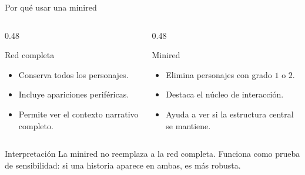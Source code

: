\documentclass[aspectratio=169,11pt]{beamer}
\begin{document}
\begin{frame}{Por qué usar una minired}
\begin{columns}[T,totalwidth=\textwidth]
\begin{column}{0.48\textwidth}
\begin{block}{Red completa}
\begin{itemize}
    \item Conserva todos los personajes.
    \item Incluye apariciones periféricas.
    \item Permite ver el contexto narrativo completo.
\end{itemize}
\end{block}
\end{column}

\begin{column}{0.48\textwidth}
\begin{block}{Minired}
\begin{itemize}
    \item Elimina personajes con grado $1$ o $2$.
    \item Destaca el núcleo de interacción.
    \item Ayuda a ver si la estructura central se mantiene.
\end{itemize}
\end{block}
\end{column}
\end{columns}

\vspace{0.35cm}
\begin{alertblock}{Interpretación}
La minired no reemplaza a la red completa. Funciona como prueba de sensibilidad: si una historia aparece en ambas, es más robusta.
\end{alertblock}
\end{frame}
\end{document}
